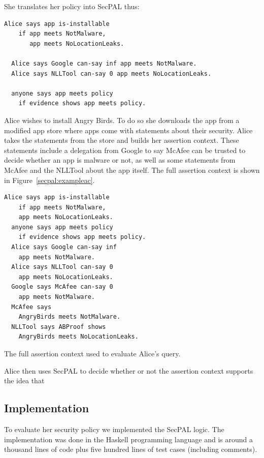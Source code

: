 \documentclass[a4paper]{article}
\begin{document}
She translates her policy into SecPAL thus:

\begin{lstlisting}[language=SecPAL]
  Alice says app is-installable 
    if app meets NotMalware, 
       app meets NoLocationLeaks.

  Alice says Google can-say inf app meets NotMalware.
  Alice says NLLTool can-say 0 app meets NoLocationLeaks.

  anyone says app meets policy
    if evidence shows app meets policy.
\end{lstlisting}

Alice wishes to install Angry Birds. To do so she downloads the app from a
modified app store where apps come with statements about their security.  Alice
takes the statements from the store and builds her assertion context.  These
statements include a delegation from Google to say McAfee can be trusted to
decide whether an app is malware or not, as well as some statements from McAfee
and the NLLTool about the app itself. The full assertion context is shown in
Figure~\ref{secpal:exampleac}.

\begin{marginfigure}\label{secpal:exampleac}
\begin{lstlisting}[language=SecPAL]
  Alice says app is-installable 
    if app meets NotMalware, 
    app meets NoLocationLeaks.
  anyone says app meets policy 
    if evidence shows app meets policy.
  Alice says Google can-say inf 
    app meets NotMalware.
  Alice says NLLTool can-say 0 
    app meets NoLocationLeaks.
  Google says McAfee can-say 0 
    app meets NotMalware.
  McAfee says 
    AngryBirds meets NotMalware.
  NLLTool says ABProof shows 
    AngryBirds meets NoLocationLeaks.
\end{lstlisting}
\caption{The full assertion context used to evaluate Alice's query.}
\end{marginfigure}

Alice then uses SecPAL to decide whether or not the assertion context supports
the idea that 

\subsection{Implementation}

To evaluate her security policy we implemented the SecPAL logic.
The implementation was done in the Haskell programming language and is around a
thousand lines of code plus five hundred lines of test cases (including
comments).
\end{document}
